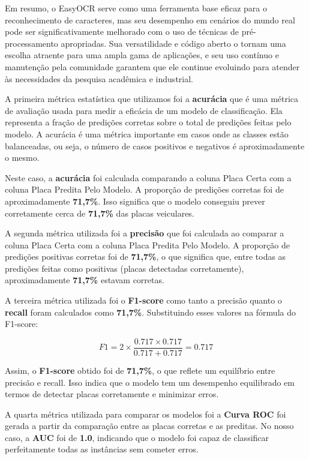 \documentclass[conference]{IEEEtran}
\begin{document}
Em resumo, o EasyOCR serve como uma ferramenta base eficaz para o reconhecimento de caracteres, mas seu desempenho em cenários do mundo real pode ser significativamente melhorado com o uso de técnicas de pré-processamento apropriadas. Sua versatilidade e código aberto o tornam uma escolha atraente para uma ampla gama de aplicações, e seu uso contínuo e manutenção pela comunidade garantem que ele continue evoluindo para atender às necessidades da pesquisa acadêmica e industrial.

A primeira métrica estatística que utilizamos foi a  \textbf{acurácia} que é uma métrica de avaliação usada para medir a eficácia de um modelo de classificação. Ela representa a fração de predições corretas sobre o total de predições feitas pelo modelo. A acurácia é uma métrica importante em casos onde as classes estão balanceadas, ou seja, o número de casos positivos e negativos é aproximadamente o mesmo.

Neste caso, a \textbf{acurácia} foi calculada comparando a coluna Placa Certa com a coluna Placa Predita Pelo Modelo. A proporção de predições corretas foi de aproximadamente \textbf{71,7\%}. Isso significa que o modelo conseguiu prever corretamente cerca de \textbf{71,7\%} das placas veiculares.

A segunda métrica utilizada foi a \textbf{precisão} que foi calculada ao comparar a coluna Placa Certa com a coluna Placa Predita Pelo Modelo. A proporção de predições positivas corretas foi de \textbf{71,7\%}, o que significa que, entre todas as predições feitas como positivas (placas detectadas corretamente), aproximadamente \textbf{71,7\%} estavam corretas.

A terceira métrica utilizada foi o \textbf{F1-score} como tanto a precisão quanto o \textbf{recall} foram calculados como \textbf{71,7\%}. Substituindo esses valores na fórmula do F1-score:

\[
F1 = 2 \times \frac{0.717 \times 0.717}{0.717 + 0.717} = 0.717
\]

Assim, o \textbf{F1-score} obtido foi de \textbf{71,7\%}, o que reflete um equilíbrio entre precisão e recall. Isso indica que o modelo tem um desempenho equilibrado em termos de detectar placas corretamente e minimizar erros.

A quarta métrica utilizada para comparar os modelos foi a \textbf{Curva ROC} foi gerada a partir da comparação entre as placas corretas e as preditas. No nosso caso, a \textbf{AUC} foi de \textbf{1.0}, indicando que o modelo foi capaz de classificar perfeitamente todas as instâncias sem cometer erros. 
\end{document}
